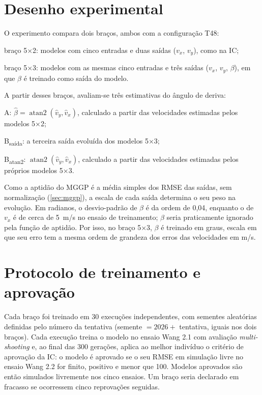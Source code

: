 

\section{Desenho experimental}\label{sec:desenho}

O experimento compara dois braços, ambos com a configuração T48:

\begin{alineas}
    \item braço 5×2: modelos com cinco entradas e duas saídas ($v_x$, $v_y$), como na IC;
    \item braço 5×3: modelos com as mesmas cinco entradas e três saídas ($v_x$, $v_y$, $\beta$), em que $\beta$ é treinado como saída do modelo.
\end{alineas}

A partir desses braços, avaliam-se três estimativas do ângulo de deriva:

\begin{alineas}
    \item A: $\hat\beta = \operatorname{atan2}(\hat v_y, \hat v_x)$, calculado a partir das velocidades estimadas pelos modelos 5×2;
    \item B\textsubscript{saída}: a terceira saída evoluída dos modelos 5×3;
    \item B\textsubscript{atan2}: $\operatorname{atan2}(\hat v_y, \hat v_x)$, calculado a partir das velocidades estimadas pelos próprios modelos 5×3.
\end{alineas}

Como a aptidão do MGGP é a média simples dos RMSE das saídas, sem normalização (\autoref{sec:mggp}), a escala de cada saída determina o seu peso na evolução. Em radianos, o desvio-padrão de $\beta$ é da ordem de 0,04, enquanto o de $v_x$ é de cerca de 5~m/s no ensaio de treinamento; $\beta$ seria praticamente ignorado pela função de aptidão. Por isso, no braço 5×3, $\beta$ é treinado em graus, escala em que seu erro tem a mesma ordem de grandeza dos erros das velocidades em m/s.

\section{Protocolo de treinamento e aprovação}\label{sec:protocolo}

Cada braço foi treinado em 30 execuções independentes, com sementes aleatórias definidas pelo número da tentativa (semente $= 2026 +$ tentativa, iguais nos dois braços). Cada execução treina o modelo no ensaio Wang 2.1 com avaliação \textit{multi-shooting} e, ao final das 300 gerações, aplica ao melhor indivíduo o critério de aprovação da IC: o modelo é aprovado se o seu RMSE em simulação livre no ensaio Wang 2.2 for finito, positivo e menor que 100. Modelos aprovados são então simulados livremente nos cinco ensaios. Um braço seria declarado em fracasso se ocorressem cinco reprovações seguidas.

